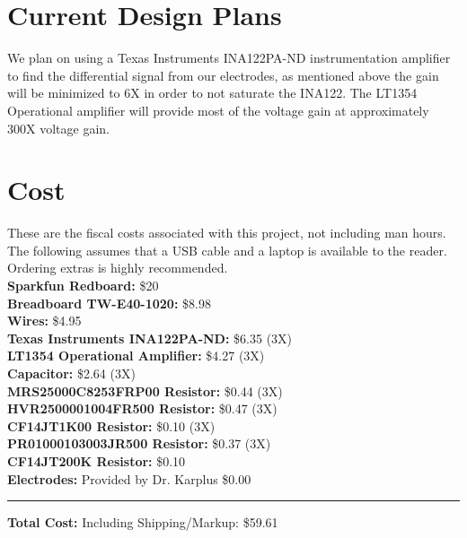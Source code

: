 \documentclass[11pt, oneside]{article}   	%
\begin{document}
\section{Current Design Plans}
We plan on using a Texas Instruments INA122PA-ND instrumentation amplifier to find the differential signal from our electrodes, as mentioned above the gain will be minimized to 6X in order to not saturate the INA122. \cite{INA122PA-ND} The LT1354 Operational amplifier will provide most of the voltage gain at approximately 300X voltage gain.



\section{Cost}
These are the fiscal costs associated with this project, not including man hours. The following assumes that a USB cable and a laptop is available to the reader. Ordering extras is highly recommended.\\

\noindent \textbf{Sparkfun Redboard:} \hfill \$20\\
\textbf{Breadboard TW-E40-1020:} \hfill \$8.98\\
\textbf{Wires:} \hfill \$4.95\\
\textbf{Texas Instruments INA122PA-ND:}  \hfill \$6.35 (3X)\\
\textbf{LT1354 Operational Amplifier:} \hfill \$4.27 (3X)\\
\textbf{Capacitor:} \hfill \$2.64 (3X)\\
\textbf{MRS25000C8253FRP00 Resistor:} \hfill\$0.44 (3X)\\
\textbf{HVR2500001004FR500 Resistor:} \hfill\$0.47 (3X)\\
\textbf{CF14JT1K00 Resistor:} \hfill\$0.10 (3X)\\
\textbf{PR01000103003JR500 Resistor:} \hfill\$0.37 (3X)\\
\textbf{CF14JT200K Resistor:} \hfill \$0.10\\
\textbf{Electrodes:} Provided by Dr. Karplus \hfill\$0.00\\
\rule{\textwidth}{1pt}
\textbf{Total Cost:} \hfill Including Shipping/Markup: \$59.61\\
\pagebreak
\end{document}
